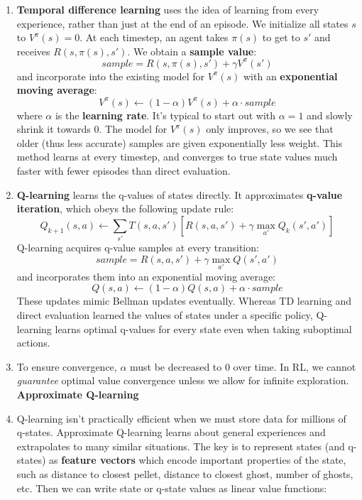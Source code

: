 \documentclass[10pt]{article}
\begin{document}
\begin{multicols}{2}
\begin{enumerate}
\begin{enumerate}
        \item \textbf{Temporal difference learning} uses the idea of learning from every experience, rather than just at the end of an episode. We initialize all states $s$ to $V^{\pi}(s)=0$. At each timestep, an agent takes $\pi(s)$ to get to $s'$ and receives $R(s,\pi(s),s')$. We obtain a \textbf{sample value}: 
        $$\textit{sample}=R(s,\pi(s),s')+\gamma V^{\pi}(s')$$ and incorporate into the existing model for $V^{\pi}(s)$ with an \textbf{exponential moving average}: $$V^{\pi}(s) \leftarrow (1-\alpha)V^{\pi}(s)+\alpha \cdot \textit{sample}$$
        where $\alpha$ is the \textbf{learning rate}. It's typical to start out with $\alpha=1$ and slowly shrink it towards 0. The model for $V^{\pi}(s)$ only improves, so we see that older (thus less accurate) samples are given exponentially less weight. This method learns at every timestep, and converges to true state values much faster with fewer episodes than direct evaluation.
        \item \textbf{Q-learning} learns the q-values of states directly. It approximates \textbf{q-value iteration}, which obeys the following update rule:
        $$Q_{k+1}(s,a) \leftarrow \sum_{s'} T(s,a,s')[R(s,a,s')+\gamma \max_{a'}Q_k(s',a')]$$
        Q-learning acquires q-value samples at every transition:
        $$\textit{sample}=R(s,a,s')+\gamma\max_{a'} Q(s',a')$$ and incorporates them into an exponential moving average:
        $$Q(s,a) \leftarrow (1-\alpha)Q(s,a)+\alpha \cdot \textit{sample}$$ 
        These updates mimic Bellman updates eventually. Whereas TD learning and direct evaluation learned the values of states under a specific policy, Q-learning learns optimal q-values for every state even when taking suboptimal actions.
        \item To ensure convergence, $\alpha$ must be decreased to 0 over time. In RL, we cannot \textit{guarantee} optimal value convergence unless we allow for infinite exploration. \\[8 pt]
        \textbf{Approximate Q-learning}
        \item Q-learning isn't practically efficient when we must store data for millions of q-states. Approximate Q-learning learns about general experiences and extrapolates to many similar situations. The key is to represent states (and q-states) as \textbf{feature vectors} which encode important properties of the state, such as distance to closest pellet, distance to closest ghost, number of ghosts, etc. Then we can write state or q-state values as linear value functions:

\end{enumerate}
\end{enumerate}
\end{multicols}
\end{document}
